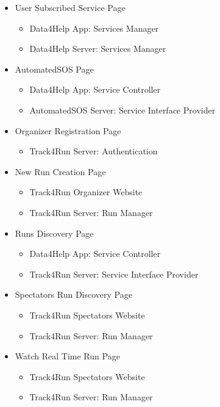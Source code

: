 \documentclass[../DD.tex]{subfiles}
\begin{document}
\begin{itemize}
		\item User Subscribed Service Page
			\begin{itemize}\item{Data4Help App: Services Manager} \item{Data4Help Server: Services Manager}\end{itemize}
		\item AutomatedSOS Page
			\begin{itemize}\item{Data4Help App: Service Controller} \item{AutomatedSOS Server: Service Interface Provider}\end{itemize}
		\item Organizer Registration Page
			\begin{itemize}\item{Track4Run Server: Authentication}\end{itemize}
		\item New Run Creation Page
			\begin{itemize}\item{Track4Run Organizer Website} \item{Track4Run Server: Run Manager}\end{itemize}
		\item Runs Discovery Page
			\begin{itemize}\item{Data4Help App: Service Controller} \item{Track4Run Server: Service Interface Provider}\end{itemize}
		\item Spectators Run Discovery Page
			\begin{itemize}\item{Track4Run Spectators Website} \item{Track4Run Server: Run Manager}\end{itemize}
		\item Watch Real Time Run Page
			\begin{itemize}\item{Track4Run Spectators Website} \item{Track4Run Server: Run Manager}\end{itemize}
	\end{itemize}
\end{document}
